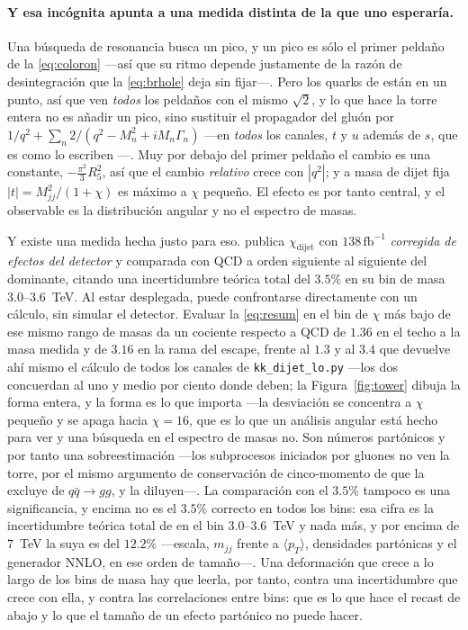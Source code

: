 \documentclass[11pt,a4paper]{article}
\begin{document}
\paragraph{Y esa incógnita apunta a una medida distinta de la que uno esperaría.} Una búsqueda de
resonancia busca un pico, y un pico es sólo el primer peldaño de la \eqref{eq:coloron} ---así que su
ritmo depende justamente de la razón de desintegración que la \eqref{eq:brhole} deja sin fijar---. Pero los
quarks de \cite{KM25} están en un punto, así que ven \emph{todos} los peldaños con el mismo
$\sqrt2$, y lo que hace la torre entera no es añadir un pico, sino sustituir el propagador del gluón por
$1/q^2+\sum_n2/(q^2-M_n^2+iM_n\Gamma_n)$ ---en \emph{todos} los canales, $t$ y $u$ además de
$s$, que es como lo escriben \cite{DMN01}---. Muy por debajo del primer peldaño el cambio es una
constante, $-\tfrac{\pi^2}{3}R_5^2$, así que el cambio \emph{relativo} crece con $|q^2|$; y a masa
de dijet fija $|t|=M_{jj}^2/(1+\chi)$ es máximo a $\chi$ pequeño. El efecto es por tanto central, y
el observable es la distribución angular y no el espectro de masas.

\noindent Y existe una medida hecha justo para eso. \cite{CMSangular} publica
$\chi_{\mathrm{dijet}}$ con $138\,\mathrm{fb}^{-1}$ \emph{corregida de efectos del detector} y
comparada con QCD a orden siguiente al siguiente del dominante, citando una incertidumbre teórica
total del $3.5\%$ en su bin de masa $3.0$--$3.6$~TeV. Al estar desplegada, puede confrontarse
directamente con un cálculo, sin simular el detector. Evaluar la \eqref{eq:resum} en el bin de
$\chi$ más bajo de ese mismo rango de masas da un cociente respecto a QCD de $1.36$ en el techo a
la masa medida y de $3.16$ en la rama del escape, frente al $1.3$ y al $3.4$ que devuelve ahí
mismo el cálculo de todos los canales de \texttt{kk\_\allowbreak dijet\_\allowbreak lo.py} ---los
dos concuerdan al uno y medio por ciento donde deben;
la Figura~\ref{fig:tower} dibuja la forma entera, y la forma es lo que importa
---la desviación se concentra a $\chi$ pequeño y se apaga hacia $\chi=16$, que es lo que un
análisis angular está hecho para ver y una búsqueda en el espectro de masas no. Son números partónicos y por tanto una sobreestimación ---los subprocesos
iniciados por gluones no ven la torre, por el mismo argumento de conservación de cinco-momento de
\cite{DMN01} que la excluye de $q\bar q\to gg$, y la diluyen---. La comparación con el $3.5\%$
tampoco es una significancia, y encima no es el $3.5\%$ correcto en todos los bins: esa cifra es
la incertidumbre teórica total de \cite{CMSangular} en el bin $3.0$--$3.6$~TeV y nada más, y por
encima de $7$~TeV la suya es del $12.2\%$ ---escala, $m_{jj}$ frente a $\langle p_T\rangle$,
densidades partónicas y el generador NNLO, en ese orden de tamaño---. Una deformación que crece a
lo largo de los bins de masa hay que leerla, por tanto, contra una incertidumbre que crece con
ella, y contra las correlaciones entre bins: que es lo que hace el recast de abajo y lo que el
tamaño de un efecto partónico no puede hacer.
\end{document}
